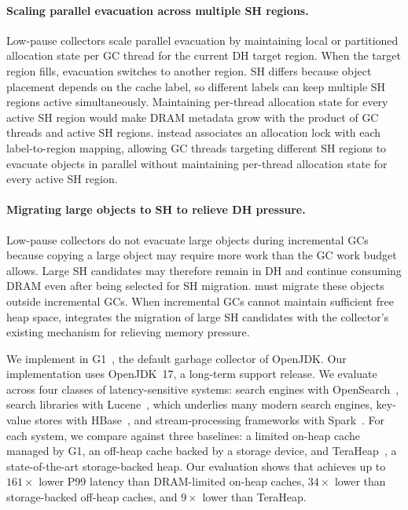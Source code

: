 \paragraph{\textbf{Scaling parallel evacuation across multiple SH regions.}}
Low-pause collectors scale parallel evacuation by maintaining local or partitioned allocation state per GC thread for the current DH target region.
When the target region fills, evacuation switches to another region.
SH differs because object placement depends on the cache label, so different labels can keep multiple SH regions active simultaneously.
Maintaining per-thread allocation state for every active SH region would make DRAM metadata grow with the product of GC threads and active SH regions.
\chipperName{} instead associates an allocation lock with each label-to-region mapping, allowing GC threads targeting different SH regions to evacuate objects in parallel without maintaining per-thread allocation state for every active SH region.

\paragraph{\textbf{Migrating large objects to SH to relieve DH pressure.}}
Low-pause collectors do not evacuate large objects during incremental GCs because copying a large object may require more work than the GC work budget allows.
Large SH candidates may therefore remain in DH and continue consuming DRAM even after being selected for SH migration.
\chipperName{} must migrate these objects outside incremental GCs.
When incremental GCs cannot maintain sufficient free heap space, \chipperName{} integrates the migration of large SH candidates with the collector's existing mechanism for relieving memory pressure.

We implement \chipperName{} in G1~\cite{detlefs:g1}, the default garbage collector of OpenJDK.
Our implementation uses OpenJDK~17, a long-term support release.
We evaluate \chipperName{} across four classes of latency-sensitive systems: search engines with OpenSearch~\cite{opensearch}, search libraries with Lucene~\cite{mccandless:lucene}, which underlies many modern search engines, key-value stores with HBase~\cite{vohra:hbase}, and stream-processing frameworks with Spark~\cite{zaharia:spark}.
For each system, we compare \chipperName{} against three baselines: a limited on-heap cache managed by G1, an off-heap cache backed by a storage device, and TeraHeap~\cite{teraheap}, a state-of-the-art storage-backed heap.
Our evaluation shows that \chipperName{} achieves up to $161\times$ lower P99 latency than DRAM-limited on-heap caches, $34\times$ lower than storage-backed off-heap caches, and $9\times$ lower than TeraHeap.

